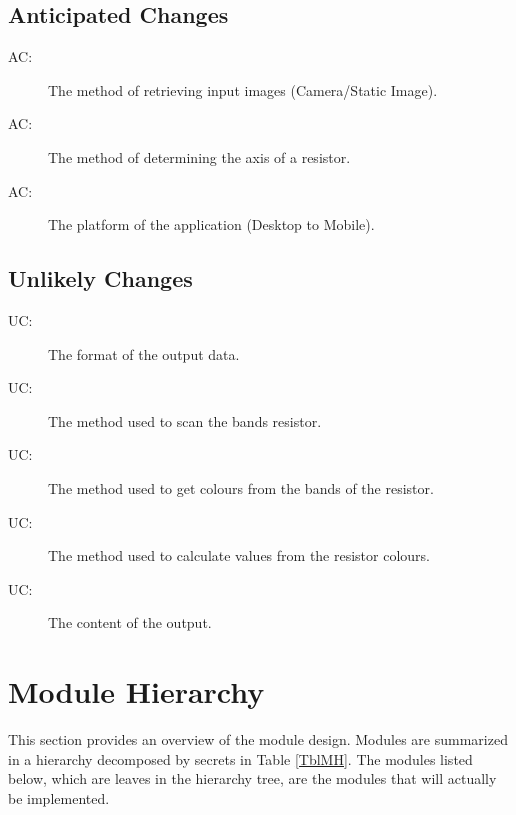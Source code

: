 \documentclass[12pt, titlepage]{article}
\newcounter{acnum}
\newcommand{\actheacnum}{AC\theacnum}
\newcounter{ucnum}
\newcommand{\uctheucnum}{UC\theucnum}
\begin{document}
\subsection{Anticipated Changes} \label{SecAchange}
\begin{description}
\item[ \actheacnum \label{acInput}:] The method of retrieving input images (Camera/Static Image).
\item[ \actheacnum \label{acAxis}:] The method of determining the axis of a resistor.
\item[ \actheacnum \label{acPlatform}:] The platform of the application (Desktop to Mobile).
\end{description}

\subsection{Unlikely Changes} \label{SecUchange}
\begin{description}
\item[ \uctheucnum \label{ucIO}:] The format of the output data.
\item[ \uctheucnum \label{ucInput}:] The method used to scan the bands resistor.
\item[ \uctheucnum \label{ucInput}:] The method used to get colours from the bands of the resistor.
\item[ \uctheucnum \label{ucInput}:] The method used to calculate values from the resistor colours.
\item[ \uctheucnum \label{ucInput}:] The content of the output.
\end{description}

\section{Module Hierarchy} \label{SecMH}

This section provides an overview of the module design. Modules are summarized
in a hierarchy decomposed by secrets in Table \ref{TblMH}. The modules listed
below, which are leaves in the hierarchy tree, are the modules that will
actually be implemented.
\end{document}
